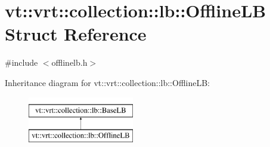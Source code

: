 \hypertarget{structvt_1_1vrt_1_1collection_1_1lb_1_1_offline_l_b}{}\section{vt\+:\+:vrt\+:\+:collection\+:\+:lb\+:\+:Offline\+LB Struct Reference}
\label{structvt_1_1vrt_1_1collection_1_1lb_1_1_offline_l_b}


{\ttfamily \#include $<$offlinelb.\+h$>$}

Inheritance diagram for vt\+:\+:vrt\+:\+:collection\+:\+:lb\+:\+:Offline\+LB\+:\begin{figure}[H]
\begin{center}
\leavevmode
\includegraphics[height=2.000000cm]{structvt_1_1vrt_1_1collection_1_1lb_1_1_offline_l_b}
\end{center}
\end{figure}
